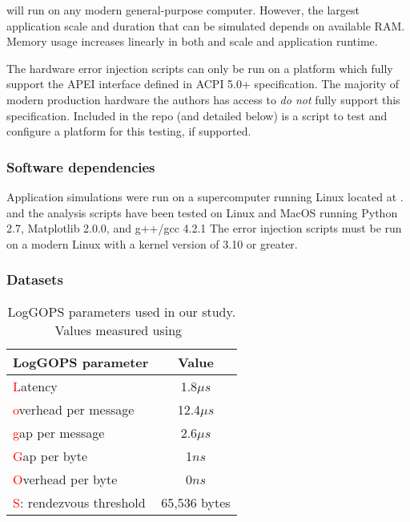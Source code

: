 \LogGOPSim will run on any modern general-purpose computer. However, the
largest application scale and duration that can be simulated depends on
available RAM.  Memory usage increases linearly in both and scale and application
runtime.

The hardware error injection scripts can only be run on a platform which fully
support the APEI interface defined in ACPI 5.0+ specification.  The majority of
modern production hardware the authors has access to \emph{do not} fully support
this specification.  Included in the repo (and detailed below) is a script to
test and configure a platform for this testing, if supported.

\subsubsection{Software dependencies}

Application simulations were run on a supercomputer running Linux located at
. \LogGOPSim and the analysis scripts have
been tested on Linux and MacOS running Python 2.7, Matplotlib 2.0.0, and g++/gcc
4.2.1  The error injection scripts must be run on a modern Linux with a kernel
version of 3.10 or greater.

\subsubsection{Datasets}

\begin{table}
\centering
\begin{tabular}{ l c }
\toprule
LogGOPS parameter & Value\\
\midrule
\textcolor{red}{L}atency                & 1.8$\mu s$ \\
\textcolor{red}{o}verhead per message   & 12.4$\mu s$ \\
\textcolor{red}{g}ap per message        & 2.6$\mu s$  \\
\textcolor{red}{G}ap per byte           & 1$ns$     \\
\textcolor{red}{O}verhead per byte      & 0$ns$     \\
\textcolor{red}{S}: rendezvous threshold  & 65,536 bytes \\
\bottomrule
\end{tabular}
\caption{
  LogGOPS parameters used in our study. Values measured using~\cite{netgauge-web}
}
\label{tab:logp}
\end{table}

